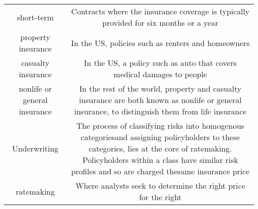\documentclass[]{book}
\begin{document}
\begin{longtable}[]{@{}cc@{}}
\begin{minipage}[t]{0.41\columnwidth}\centering\strut
short-term\strut
\end{minipage} & \begin{minipage}[t]{0.42\columnwidth}\centering\strut
Contracts where the insurance coverage is typically provided for six
months or a year\strut
\end{minipage}\tabularnewline
\begin{minipage}[t]{0.41\columnwidth}\centering\strut
property insurance\strut
\end{minipage} & \begin{minipage}[t]{0.42\columnwidth}\centering\strut
In the US, policies such as renters and homeowners\strut
\end{minipage}\tabularnewline
\begin{minipage}[t]{0.41\columnwidth}\centering\strut
casualty insurance\strut
\end{minipage} & \begin{minipage}[t]{0.42\columnwidth}\centering\strut
In the US, a policy such as auto that covers medical damages to
people\strut
\end{minipage}\tabularnewline
\begin{minipage}[t]{0.41\columnwidth}\centering\strut
nonlife or general insurance\strut
\end{minipage} & \begin{minipage}[t]{0.42\columnwidth}\centering\strut
In the rest of the world, property and casualty insurance are both known
as nonlife or general insurance, to distinguish them from life
insurance\strut
\end{minipage}\tabularnewline
\begin{minipage}[t]{0.41\columnwidth}\centering\strut
Underwriting\strut
\end{minipage} & \begin{minipage}[t]{0.42\columnwidth}\centering\strut
The process of classifying risks into homogenous categoriesand assigning
policyholders to these categories, lies at the core of ratemaking.
Policyholders within a class have similar risk profiles and so are
charged thesame insurance price\strut
\end{minipage}\tabularnewline
\begin{minipage}[t]{0.41\columnwidth}\centering\strut
ratemaking\strut
\end{minipage} & \begin{minipage}[t]{0.42\columnwidth}\centering\strut
Where analysts seek to determine the right price for the right

\end{minipage}
\end{longtable}
\end{document}

